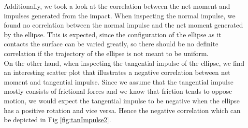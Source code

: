 \documentclass{article}
\begin{document}
\noindent Additionally, we took a look at the correlation between the net moment and impulses generated from the impact. When inspecting the normal impulse, we found no correlation between the normal impulse and the net moment generated by the ellipse. This is expected, since the configuration of the ellipse as it contacts the surface can be varied greatly, so there should be no definite correlation if the trajectory of the ellipse is not meant to be uniform. \\

\noindent On the other hand, when inspecting the tangential impulse of the ellipse, we find an interesting scatter plot that illustrates a negative correlation between net moment and tangential impulse. Since we assume that the tangential impulse mostly consists of frictional forces and we know that friction tends to oppose motion, we would expect the tangential impulse to be negative when the ellipse has a positive rotation and vice versa. Hence the negative correlation which can be depicted in Fig \ref{fig:tanImpulse2}.
\end{document}
